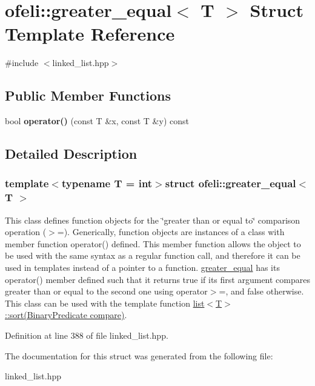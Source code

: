 \hypertarget{structofeli_1_1greater__equal}{\section{ofeli\-:\-:greater\-\_\-equal$<$ T $>$ Struct Template Reference}
\label{structofeli_1_1greater__equal}
}


{\ttfamily \#include $<$linked\-\_\-list.\-hpp$>$}

\subsection*{Public Member Functions}
\begin{DoxyCompactItemize}
\item 
\hypertarget{structofeli_1_1greater__equal_a5042ca3313adcc116ad2394b7aaacacc}{bool {\bfseries operator()} (const T \&x, const T \&y) const }\label{structofeli_1_1greater__equal_a5042ca3313adcc116ad2394b7aaacacc}

\end{DoxyCompactItemize}


\subsection{Detailed Description}
\subsubsection*{template$<$typename T = int$>$struct ofeli\-::greater\-\_\-equal$<$ T $>$}

This class defines function objects for the \char`\"{}greater than or equal to\char`\"{} comparison operation ($>$=). Generically, function objects are instances of a class with member function {\ttfamily operator()} defined. This member function allows the object to be used with the same syntax as a regular function call, and therefore it can be used in templates instead of a pointer to a function. {\ttfamily \hyperlink{structofeli_1_1greater__equal}{greater\-\_\-equal}} has its {\ttfamily operator()} member defined such that it returns {\ttfamily true} if its first argument compares greater than or equal to the second one using {\ttfamily operator$>$=}, and {\ttfamily false} otherwise. This class can be used with the template function {\ttfamily \hyperlink{classofeli_1_1list_aaeedac18b70d233644d84c7ad3a9a3fa}{list$<$\-T$>$\-::sort(\-Binary\-Predicate compare)}}. 

Definition at line 388 of file linked\-\_\-list.\-hpp.



The documentation for this struct was generated from the following file\-:\begin{DoxyCompactItemize}
\item 
linked\-\_\-list.\-hpp\end{DoxyCompactItemize}
